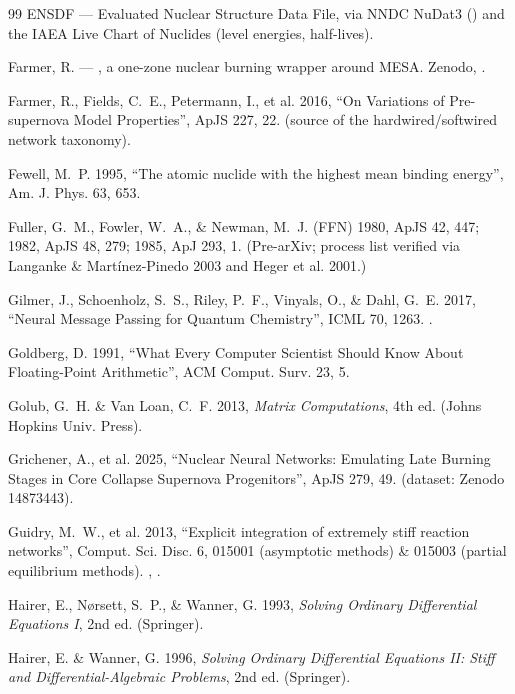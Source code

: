 \begin{thebibliography}{99}
ENSDF --- Evaluated Nuclear Structure Data File, via NNDC NuDat3
() and the IAEA Live Chart of Nuclides (level energies,
half-lives).

Farmer, R. --- , a one-zone nuclear burning wrapper around MESA.
Zenodo, .

Farmer, R., Fields, C.~E., Petermann, I., et al. 2016, ``On Variations of
Pre-supernova Model Properties'', ApJS 227, 22.  (source of
the hardwired/softwired network taxonomy).

Fewell, M.~P. 1995, ``The atomic nuclide with the highest mean binding
energy'', Am. J. Phys. 63, 653.

Fuller, G.~M., Fowler, W.~A., \& Newman, M.~J. (FFN) 1980, ApJS 42, 447; 1982,
ApJS 48, 279; 1985, ApJ 293, 1. (Pre-arXiv; process list verified via Langanke
\& Martínez-Pinedo 2003 and Heger et al. 2001.)

Gilmer, J., Schoenholz, S.~S., Riley, P.~F., Vinyals, O., \& Dahl, G.~E. 2017,
``Neural Message Passing for Quantum Chemistry'', ICML 70, 1263.
.

Goldberg, D. 1991, ``What Every Computer Scientist Should Know About
Floating-Point Arithmetic'', ACM Comput. Surv. 23, 5.

Golub, G.~H. \& Van Loan, C.~F. 2013, \emph{Matrix Computations}, 4th ed.
(Johns Hopkins Univ. Press).

Grichener, A., et al. 2025, ``Nuclear Neural Networks: Emulating Late Burning
Stages in Core Collapse Supernova Progenitors'', ApJS 279, 49.
 (dataset: Zenodo 14873443).

Guidry, M.~W., et al. 2013, ``Explicit integration of extremely stiff reaction
networks'', Comput. Sci. Disc. 6, 015001 (asymptotic methods) \& 015003
(partial equilibrium methods). , .

Hairer, E., Nørsett, S.~P., \& Wanner, G. 1993, \emph{Solving Ordinary
Differential Equations I}, 2nd ed. (Springer).

Hairer, E. \& Wanner, G. 1996, \emph{Solving Ordinary Differential Equations
II: Stiff and Differential-Algebraic Problems}, 2nd ed. (Springer).


\end{thebibliography}
